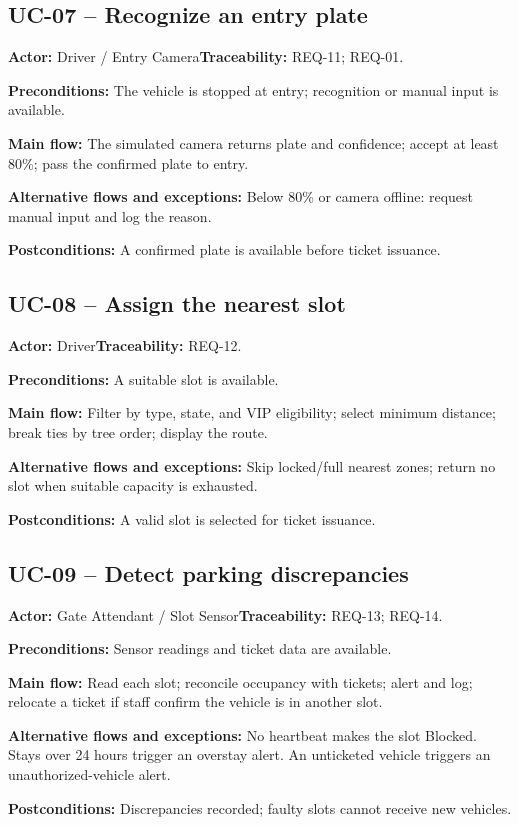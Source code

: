 \subsection{UC-07 -- Recognize an entry plate}
\noindent\textbf{Actor:} Driver / Entry Camera\quad\textbf{Traceability:} REQ-11; REQ-01.
\par\textbf{Preconditions:} The vehicle is stopped at entry; recognition or manual input is available.
\par\textbf{Main flow:} The simulated camera returns plate and confidence; accept at least 80\%; pass the confirmed plate to entry.
\par\textbf{Alternative flows and exceptions:} Below 80\% or camera offline: request manual input and log the reason.
\par\textbf{Postconditions:} A confirmed plate is available before ticket issuance.
\subsection{UC-08 -- Assign the nearest slot}
\noindent\textbf{Actor:} Driver\quad\textbf{Traceability:} REQ-12.
\par\textbf{Preconditions:} A suitable slot is available.
\par\textbf{Main flow:} Filter by type, state, and VIP eligibility; select minimum distance; break ties by tree order; display the route.
\par\textbf{Alternative flows and exceptions:} Skip locked/full nearest zones; return no slot when suitable capacity is exhausted.
\par\textbf{Postconditions:} A valid slot is selected for ticket issuance.
\subsection{UC-09 -- Detect parking discrepancies}
\noindent\textbf{Actor:} Gate Attendant / Slot Sensor\quad\textbf{Traceability:} REQ-13; REQ-14.
\par\textbf{Preconditions:} Sensor readings and ticket data are available.
\par\textbf{Main flow:} Read each slot; reconcile occupancy with tickets; alert and log; relocate a ticket if staff confirm the vehicle is in another slot.
\par\textbf{Alternative flows and exceptions:} No heartbeat makes the slot Blocked. Stays over 24 hours trigger an overstay alert. An unticketed vehicle triggers an unauthorized-vehicle alert.
\par\textbf{Postconditions:} Discrepancies recorded; faulty slots cannot receive new vehicles.
